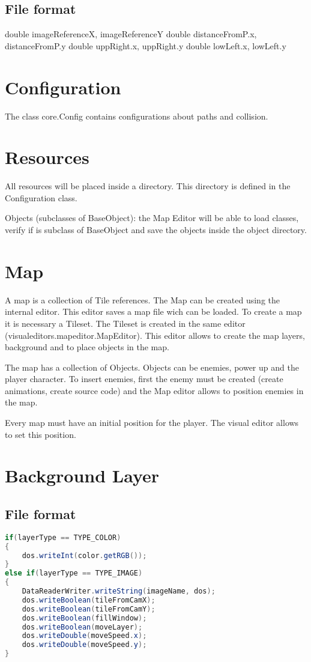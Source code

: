 			\subsection{File format}
			double  imageReferenceX, imageReferenceY
			double distanceFromP.x, distanceFromP.y
			double uppRight.x, uppRight.y
			double lowLeft.x, lowLeft.y
	
\section{Configuration}
	The class core.Config contains configurations about paths and collision.
	
\section{Resources}
	All resources will be placed inside a directory. This directory is defined in the Configuration class. 
	
	Objects (subclasses of BaseObject): the Map Editor will be able to load classes, verify if is subclass of BaseObject and save the objects inside the object directory. 
	
\section{Map}
	A map is a collection of Tile references. The Map can be created using the internal editor. This editor saves a map file wich can be loaded. To create a map it is necessary a Tileset. The Tileset is created in the same editor (visualeditors.mapeditor.MapEditor). This editor allows to create the map layers, background and to place objects in the map.
	
	The map has a collection of Objects. Objects can be enemies, power up and the player character. To insert enemies, first the enemy must be created (create animations, create source code) and the Map editor allows to position enemies in the map.
	
	Every map must have an initial position for the player. The visual editor allows to set this position.
\section{Background Layer	}
\subsection{File format}
\begin{lstlisting}[caption={File format},label={animfileformat},language=Java]
if(layerType == TYPE_COLOR)
{
	dos.writeInt(color.getRGB());
}
else if(layerType == TYPE_IMAGE)
{
	DataReaderWriter.writeString(imageName, dos);
	dos.writeBoolean(tileFromCamX);
	dos.writeBoolean(tileFromCamY);
	dos.writeBoolean(fillWindow);
	dos.writeBoolean(moveLayer);
	dos.writeDouble(moveSpeed.x);
	dos.writeDouble(moveSpeed.y);
}
\end{lstlisting}